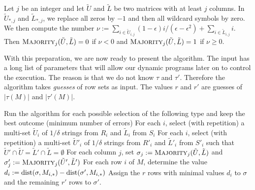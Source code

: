 \begin{definition}
    Let $j$ be an integer and let $\tilde{U}$ and $\tilde{L}$ be two matrices with at least $j$ columns.
    In $\tilde{U}_{*,j}$ and $\tilde{L}_{*,j}$, we replace all zeros by $-1$ and then all wildcard symbols by zero.
    We then compute the number
    $\nu := \sum_{i \in \tilde{U}_{i,j}} (1-\epsilon)i/(\epsilon - \epsilon^2) + \sum_{i \in \tilde{L}_{i,j}} i$. 
    Then $\textsc{Majority}_j(\tilde{U}, \tilde{L}) = 0$ if $\nu <0$ and $\textsc{Majority}_j(\tilde{U}, \tilde{L}) = 1$ if $\nu \ge 0$.
    \label{def:weighted-majority}
\end{definition}
With this preparation, we are now ready to present the algorithm.
The input has a long list of parameters that will allow our dynamic programs later on to control the execution.
The reason is that we do not know $\tau$ and $\tau'$. 
Therefore the algorithm takes \emph{guesses} of row sets as input.
The values $r$ and $r'$ are guesses of $|\tau(M)|$ and $|\tau'(M)|$.
\smallskip

\begin{algorithm}[H] 
    \caption{
        \label{alg:SWC}
        $\textsc{SWC}_\delta$}
    \SetAlgoNoLine
    \SetNlSkip{1em}
    Run the algorithm for each possible selection of the following type and keep the best outcome (minimum number of errors)
    For each $i$, select (with repetition) a multi-set $\tilde{U}_i$ of $1/\delta$ strings from $R_i$ and $\tilde{L}_i$ from $S_i$\;
    For each $i$, select (with repetition) a multi-set $\tilde{U}'_i$ of $1/\delta$ strings from $R'_i$ and $\tilde{L}'_i$ from $S'_i$ such that $\tilde{U}' \cap \tilde{U} = \tilde{L}' \cap \tilde{L} = \emptyset$\;
    For each column $j$, set $\sigma_j := \textsc{Majority}_j(\tilde{U}, \tilde{L})$ and $\sigma'_j := \textsc{Majority}_j(\tilde{U}', \tilde{L}')$\;
    For each row $i$ of $M$, determine the value $d_i := \mathrm{dist}(\sigma,M_{i,*}) - \mathrm{dist}(\sigma',M_{i,*})$\;
    Assign the $r$ rows with minimal values $d_i$ to $\sigma$ and the remaining $r'$ rows to $\sigma'$.
\end{algorithm}
\smallskip

